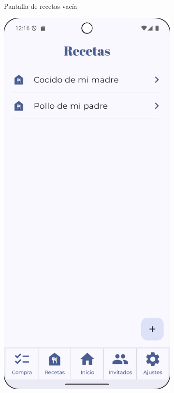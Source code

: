 \begin{figure}[H]
\begin{subfigure}[b]{0.3\textwidth}
      \caption{Pantalla de recetas vacía}
      \label{fig:recipes-empty}
    \end{subfigure}
    \hfill
    \begin{subfigure}[b]{0.3\textwidth}
      \includegraphics[width=\textwidth]{./img/manual/recipes_not_empty.png}

\end{subfigure}
\end{figure}
